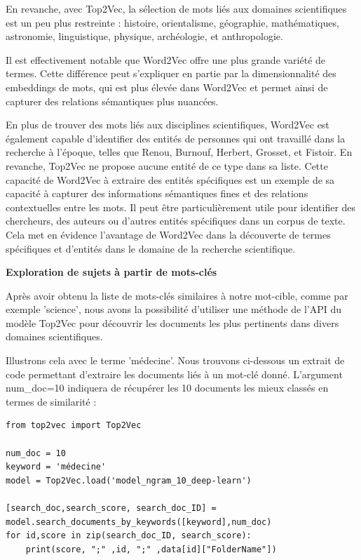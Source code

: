 En revanche, avec Top2Vec, la sélection de mots liés aux domaines scientifiques est un peu plus restreinte : histoire, orientalisme, géographie, mathématiques, astronomie, linguistique, physique, archéologie, et anthropologie.

Il est effectivement notable que Word2Vec offre une plus grande variété de termes. Cette différence peut s'expliquer en partie par la dimensionnalité des embeddings de mots, qui est plus élevée dans Word2Vec et permet ainsi de capturer des relations sémantiques plus nuancées.

En plus de trouver des mots liés aux disciplines scientifiques, Word2Vec est également capable d'identifier des entités de personnes qui ont travaillé dans la recherche à l'époque, telles que Renou, Burnouf, Herbert, Grosset, et Fistoir. En revanche, Top2Vec ne propose aucune entité de ce type dans sa liste. Cette capacité de Word2Vec à extraire des entités spécifiques est un exemple de sa capacité à capturer des informations sémantiques fines et des relations contextuelles entre les mots. Il peut être particulièrement utile pour identifier des chercheurs, des auteurs ou d'autres entités spécifiques dans un corpus de texte. Cela met en évidence l'avantage de Word2Vec dans la découverte de termes spécifiques et d'entités dans le domaine de la recherche scientifique.

\textbf{Exploration de sujets à partir de mots-clés}

Après avoir obtenu la liste de mots-clés similaires à notre mot-cible, comme par exemple 'science', nous avons la possibilité d'utiliser une méthode de l'API du modèle Top2Vec pour découvrir les documents les plus pertinents dans divers domaines scientifiques.

Illustrons cela avec le terme 'médecine'. Nous trouvons ci-dessous un extrait de code permettant d'extraire les documents liés à un mot-clé donné. L'argument num\_doc=10 indiquera de récupérer les 10 documents les mieux classés en termes de similarité :

\begin{lstlisting}
from top2vec import Top2Vec

num_doc = 10
keyword = 'médecine'
model = Top2Vec.load('model_ngram_10_deep-learn')

[search_doc,search_score, search_doc_ID] = model.search_documents_by_keywords([keyword],num_doc)
for id,score in zip(search_doc_ID, search_score):
    print(score, ";" ,id, ";" ,data[id]["FolderName"])
\end{lstlisting}

